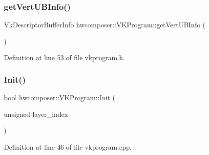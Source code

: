 \subsubsection{\texorpdfstring{get\+Vert\+U\+B\+Info()}{getVertUBInfo()}}
{\footnotesize\ttfamily Vk\+Descriptor\+Buffer\+Info hwcomposer\+::\+V\+K\+Program\+::get\+Vert\+U\+B\+Info (\begin{DoxyParamCaption}{ }\end{DoxyParamCaption})\hspace{0.3cm}{\ttfamily [inline]}}



Definition at line 53 of file vkprogram.\+h.


\begin{DoxyCode}{0}
\end{DoxyCode}
\mbox{\label{classhwcomposer_1_1VKProgram_a9c39fc6ef39a73ea5a8b7abf3d487f61}} 
\subsubsection{\texorpdfstring{Init()}{Init()}}
{\footnotesize\ttfamily bool hwcomposer\+::\+V\+K\+Program\+::\+Init (\begin{DoxyParamCaption}\item[{unsigned}]{layer\+\_\+index }\end{DoxyParamCaption})}



Definition at line 46 of file vkprogram.\+cpp.


